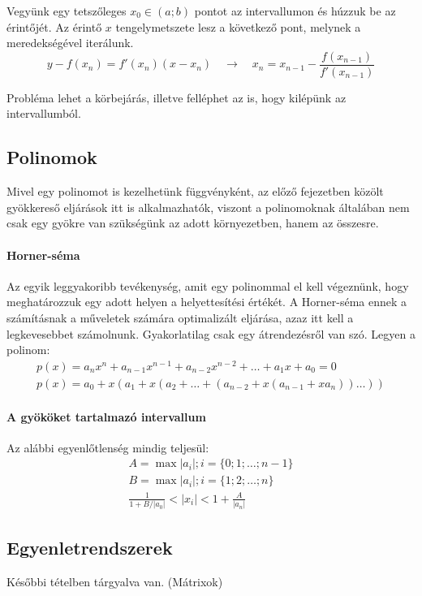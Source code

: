\documentclass[../../main.tex]{subfiles}
\begin{document}
Vegyünk egy tetszőleges $x_0 \in (a; b)$ pontot az intervallumon és húzzuk
be az érintőjét. Az érintő $x$ tengelymetszete lesz a következő pont,
melynek a meredekségével iterálunk.
\[
  y - f(x_n) = f'(x_n)(x - x_n)
  \quad \rightarrow \quad x_n = x_{n-1} - \frac{f(x_{n-1})}{f'(x_{n-1})}
\]

Probléma lehet a körbejárás, illetve felléphet az is, hogy kilépünk az
intervallumból.

\subsection{Polinomok}

Mivel egy polinomot is kezelhetünk függvényként, az előző fejezetben közölt
gyökkereső eljárások itt is alkalmazhatók, viszont a polinomoknak általában
nem csak egy gyökre van szükségünk az adott környezetben, hanem az összesre.

\paragraph{Horner-séma}

Az egyik leggyakoribb tevékenység, amit egy polinommal el kell végeznünk,
hogy meghatározzuk egy adott helyen a helyettesítési értékét. A Horner-séma
ennek a számításnak a műveletek számára optimalizált eljárása, azaz itt kell a
legkevesebbet számolnunk. Gyakorlatilag csak egy átrendezésről van szó.
Legyen a polinom:
\begin{gather*}
  p(x)
  = a_n x^n
  + a_{n-1} x^{n-1}
  + a_{n-2} x^{n-2}
  + \dots
  + a_1 x
  + a_0
  = 0
  \\
  p(x)
  =
  a_0 + x (
  a_1 + x (
  a_2 + \dots + (
  a_{n-2} + x (
  a_{n-1} + x a_n
  )) \dots ))
\end{gather*}

\paragraph{A gyököket tartalmazó intervallum}

Az alábbi egyenlőtlenség mindig teljesül:
\begin{gather*}
  A = \max{|a_i|; i = \{0;1;\dots;n-1\}} \\
  B = \max{|a_i|; i = \{1;2;\dots;n\}} \\
  \frac{1}{1 + B / |a_0|} < |x_i| < 1 + \frac{A}{|a_n|}
\end{gather*}

\subsection{Egyenletrendszerek}

Későbbi tételben tárgyalva van. (Mátrixok)
\end{document}
